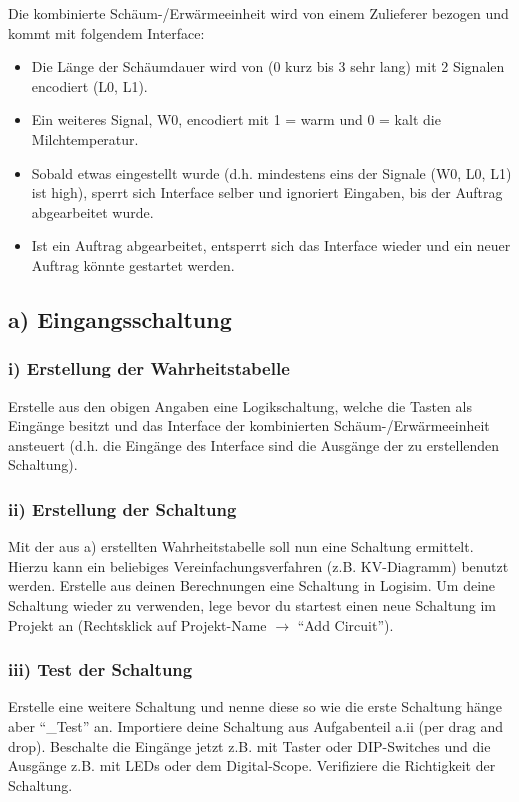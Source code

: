 \documentclass[a4paper]{scrartcl}
\begin{document}
Die kombinierte Schäum-/Erwärmeeinheit wird von einem Zulieferer bezogen und kommt mit folgendem Interface:
\begin{itemize}
	\item Die Länge der Schäumdauer wird von (0 kurz bis 3 sehr lang) mit 2 Signalen encodiert (L0, L1).
	\item Ein weiteres Signal, W0, encodiert mit 1 = warm und 0 = kalt die Milchtemperatur.
	\item Sobald etwas eingestellt wurde (d.h. mindestens eins der Signale (W0, L0, L1) ist high), sperrt sich Interface selber und ignoriert Eingaben, bis der Auftrag abgearbeitet wurde.
	\item Ist ein Auftrag abgearbeitet, entsperrt sich das Interface wieder und ein neuer Auftrag könnte gestartet werden.
\end{itemize}


\subsection*{a) Eingangsschaltung}
\subsubsection*{i)  Erstellung der Wahrheitstabelle}

Erstelle aus den obigen Angaben eine Logikschaltung, welche die Tasten als Eingänge besitzt und das Interface der kombinierten Schäum-/Erwärmeeinheit ansteuert (d.h. die Eingänge des Interface sind die Ausgänge der zu erstellenden Schaltung).

\subsubsection*{ii) Erstellung der Schaltung}
Mit der aus a) erstellten Wahrheitstabelle soll nun eine Schaltung ermittelt. Hierzu kann ein beliebiges Vereinfachungsverfahren (z.B. KV-Diagramm) benutzt werden. 
Erstelle aus deinen Berechnungen eine Schaltung in Logisim. Um deine Schaltung wieder zu verwenden, lege bevor du startest einen neue Schaltung im Projekt an 
(Rechtsklick auf Projekt-Name $\rightarrow$ ``Add Circuit'').

\subsubsection*{iii) Test der Schaltung}
Erstelle eine weitere Schaltung und nenne diese so wie die erste Schaltung hänge aber ``\_Test'' an. Importiere deine Schaltung aus Aufgabenteil a.ii (per drag and drop).
Beschalte die Eingänge jetzt z.B. mit Taster oder DIP-Switches und die Ausgänge z.B. mit LEDs oder dem Digital-Scope.
Verifiziere die Richtigkeit der Schaltung.
\end{document}
